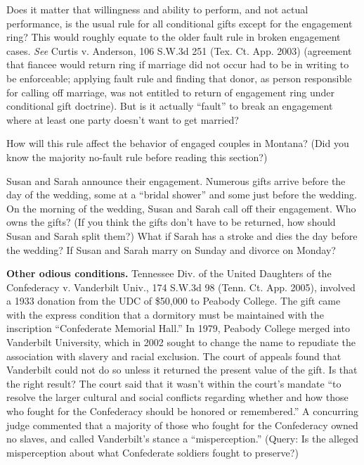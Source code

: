 Does it matter that willingness and ability to perform, and not actual
performance, is the usual rule for all conditional gifts except for the
engagement ring?  This would roughly equate to the older fault rule in broken
engagement cases.  \textit{See} Curtis v. Anderson, 106 S.W.3d 251 (Tex. Ct.
App. 2003) (agreement that fiancee would return ring if marriage did not occur
had to be in writing to be enforceable; applying fault rule and finding that
donor, as person responsible for calling off marriage, was not entitled to
return of engagement ring under conditional gift doctrine).  But is it actually
``fault'' to break an engagement where at least one party doesn't want to get
married?  


\item How will this rule affect the behavior of engaged couples in Montana? 
(Did you know the majority no-fault rule before reading this section?)


\item Susan and Sarah announce their engagement.  Numerous gifts arrive before
the day of the wedding, some at a ``bridal shower'' and some just before the
wedding.  On the morning of the wedding, Susan and Sarah call off their
engagement. Who owns the gifts?  (If you think the gifts don't have to be
returned, how should Susan and Sarah split them?) What if Sarah has a stroke
and dies the day before the wedding? If Susan and Sarah marry on Sunday and
divorce on Monday?


\item \textbf{Other odious conditions.} Tennessee Div. of the United Daughters
of the Confederacy v. Vanderbilt Univ., 174 S.W.3d 98 (Tenn. Ct. App. 2005),
involved a 1933 donation from the UDC of \$50,000 to Peabody College. The gift
came with the express condition that a dormitory must be maintained with the
inscription ``Confederate Memorial Hall.'' In 1979, Peabody College merged into
Vanderbilt University, which in 2002 sought to change the name to repudiate the
association with slavery and racial exclusion.  The court of appeals found that
Vanderbilt could not do so unless it returned the present value of the gift. 
Is that the right result?  The court said that it wasn't within the court's
mandate ``to resolve the larger cultural and social conflicts regarding whether
and how those who fought for the Confederacy should be honored or remembered.''
 A concurring judge commented that a majority of those who fought for the
Confederacy owned no slaves, and called Vanderbilt's stance a
``misperception.''  (Query: Is the alleged misperception about what Confederate
soldiers fought to preserve?)


